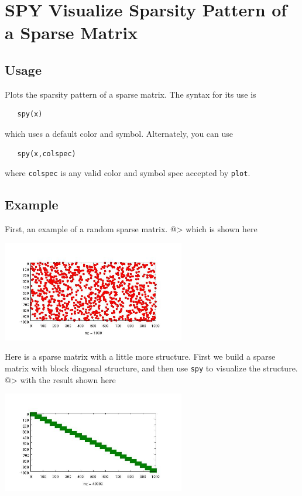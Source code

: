 \section{SPY Visualize Sparsity Pattern of a Sparse Matrix}

\subsection{Usage}

Plots the sparsity pattern of a sparse matrix.  The syntax for its use is
\begin{verbatim}
   spy(x)
\end{verbatim}
which uses a default color and symbol.  Alternately, you can use
\begin{verbatim}
   spy(x,colspec)
\end{verbatim}
where \verb|colspec| is any valid color and symbol spec accepted by \verb|plot|.
\subsection{Example}

First, an example of a random sparse matrix.
@>
which is shown here


\centerline{\includegraphics[width=8cm]{spy1}}

Here is a sparse matrix with a little more structure.  First we build a 
sparse matrix with block diagonal structure, and then use \verb|spy| to 
visualize the structure.
@>
with the result shown here


\centerline{\includegraphics[width=8cm]{spy2}}

